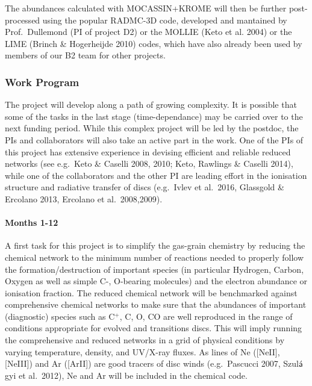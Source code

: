 \documentclass[10pt,fleqn,twoside]{article}
\begin{document}
The abundances calculated with MOCASSIN+KROME will then be further
post-processed using the popular RADMC-3D code, developed and mantained
by Prof.\ Dullemond (PI of project D2) or the MOLLIE (Keto et
al. 2004) or the LIME (Brinch \&
Hogerheijde 2010) codes, which have also already been used by members of our
B2 team for other projects. 


\subsubsection{Work Program}


The project will develop along a path of growing complexity. It is
possible that some of the tasks in the last stage (time-dependance)
may be carried over to the next funding period. While this complex
project will be led by the postdoc, the PIs and collaborators will
also take an active part in the work. One of the PIs of this project
has extensive experience in devising efficient and reliable reduced
networks (see e.g.\ Keto \& Caselli 2008, 2010; Keto, Rawlings \&
Caselli 2014), while one of the collaborators and the other PI are
leading effort in the ionisation structure and radiative transfer of
discs (e.g.\ Ivlev et al.\ 2016, Glassgold \& Ercolano 2013, Ercolano
et al.\ 2008,2009).   

\paragraph{Months 1-12}

 A first task for this
project is to simplify the gas-grain chemistry by reducing the chemical network to the minimum number of reactions needed to properly follow the formation/destruction of important species (in particular Hydrogen, Carbon, Oxygen as well as simple C-, O-bearing molecules) and the electron abundance or ionisation fraction. 
The reduced chemical network will be benchmarked against comprehensive chemical networks to make sure that the abundances of  important (diagnostic) species such as C$^+$, C, O, CO are well reproduced in the range of conditions appropriate for evolved and
transitions discs. This will imply running the comprehensive and reduced networks in a grid of physical conditions by varying temperature, density, and UV/X-ray fluxes.  As lines of Ne ([NeII], [NeIII]) and Ar ([ArII]) are good tracers of disc winds (e.g.\ Pascucci 2007, Szul$\acute{\textsf a}$gyi et al.\ 2012), Ne and Ar will be included in the chemical code. 
\end{document}
